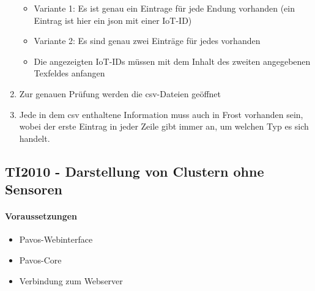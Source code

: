\begin{enumerate}
\begin{itemize}
\item Variante 1: Es ist genau ein Eintrage für jede Endung vorhanden (ein Eintrag ist hier ein json mit einer IoT-ID)
\item Variante 2: Es sind genau zwei Einträge für jedes vorhanden
\item Die angezeigten IoT-IDs müssen mit dem Inhalt des zweiten angegebenen Texfeldes anfangen
\end{itemize}
\item Zur genauen Prüfung werden die csv-Dateien geöffnet
\item Jede in dem csv enthaltene Information muss auch in Frost vorhanden sein, wobei der erste Eintrag in jeder Zeile gibt immer an, um welchen Typ es sich handelt.
\end{enumerate}
\szenarioGood

\subsection{TI2010 - Darstellung von Clustern ohne Sensoren}
\paragraph{Voraussetzungen}
\begin{itemize}
\item Pavos-Webinterface
\item Pavos-Core
\item Verbindung zum Webserver
\end{itemize}
